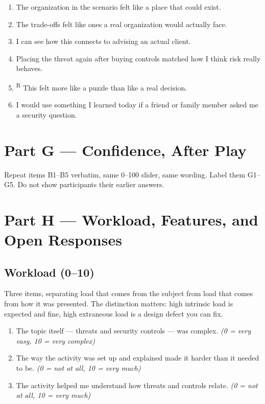\documentclass[11pt,letterpaper]{article}
\newcommand{\R}{\textsuperscript{R}}
\begin{document}
\begin{enumerate}[label=F\arabic*.]
\item The organization in the scenario felt like a place that could exist.
\item The trade-offs felt like ones a real organization would actually face.
\item I can see how this connects to advising an actual client.
\item Placing the threat again after buying controls matched how I think risk
really behaves.
\item\R{} This felt more like a puzzle than like a real decision.
\item I would use something I learned today if a friend or family member asked me
a security question.
\end{enumerate}

\section{Part G --- Confidence, After Play}

Repeat items B1--B5 verbatim, same 0--100 slider, same wording. Label them
G1--G5. Do not show participants their earlier answers.

\section{Part H --- Workload, Features, and Open Responses}

\subsection{Workload (0--10)}

Three items, separating load that comes from the subject from load that comes
from how it was presented. The distinction matters: high intrinsic load is
expected and fine, high extraneous load is a design defect you can fix.

\begin{enumerate}[label=H\arabic*.]
\item The topic itself --- threats and security controls --- was complex.
\emph{(0 = very easy, 10 = very complex)}
\item The way the activity was set up and explained made it harder than it
needed to be. \emph{(0 = not at all, 10 = very much)}
\item The activity helped me understand how threats and controls relate.
\emph{(0 = not at all, 10 = very much)}
\end{enumerate}
\end{document}
